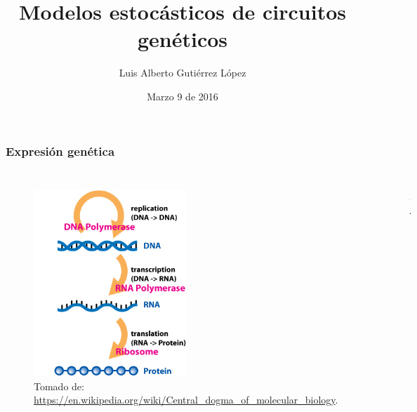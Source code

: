 \documentclass{beamer}
\title[Estocasticidad en circuitos gen\'eticos]{Modelos estoc\'asticos de circuitos gen\'eticos}
\author{Luis Alberto Guti\'errez L\'opez}
\institute[Uniandes]{Universidad de los Andes\\
Departamento de F\'isica\\
\medskip
}
\date{Marzo 9 de 2016}
\begin{document}
\begin{frame}
\titlepage
\end{frame}

\begin{frame}
\frametitle{Expresi\'on gen\'etica}

\begin{columns}[c]

\begin{figure}[p]
    \centering
    \includegraphics[width=0.5\textwidth]{dogma.jpg}\\
    \tiny Tomado de: \url{https://en.wikipedia.org/wiki/Central_dogma_of_molecular_biology}.
\end{figure}


\begin{figure}[p]
    \centering
    \includegraphics[width=0.3\textwidth]{plasmid.png}\\
    \tiny \cite{cooper00}.
\end{figure}


\end{columns}
\end{frame}
\end{document}
